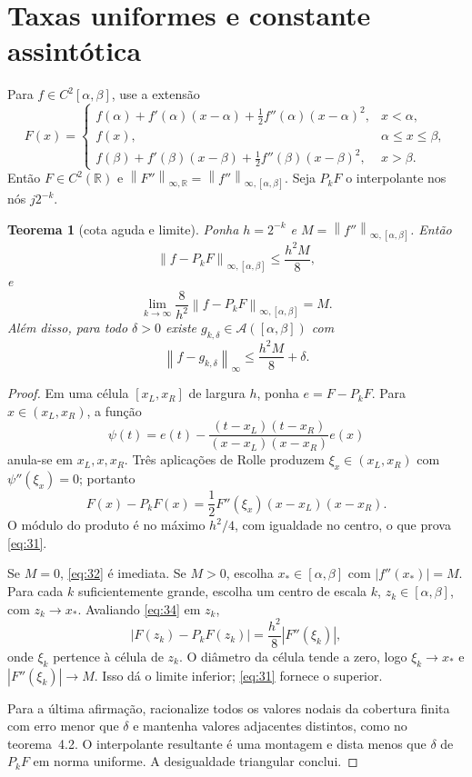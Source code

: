 \documentclass[11pt,a4paper]{article}
\theoremstyle{preciso}
\newtheorem{teorema}{Teorema}[section]
\theoremstyle{definition}
\newcommand{\R}{\mathbb R}
\newcommand{\Asm}{\mathcal A}
\newcommand{\norm}[1]{\left\|#1\right\|_{\infty}}
\newcommand{\normK}[2]{\left\|#1\right\|_{\infty,#2}}
\newcommand{\eqn}[2]{\begin{equation}\label{eq:#1}#2\end{equation}}
\begin{document}


\section{Taxas uniformes e constante assintótica}
Para $f\in C^2[\alpha,\beta]$, use a extensão
\eqn{30}{F(x)=\begin{cases}
f(\alpha)+f'(\alpha)(x-\alpha)+\frac12f''(\alpha)(x-\alpha)^2,&x<\alpha,\\
f(x),&\alpha\le x\le\beta,\\
f(\beta)+f'(\beta)(x-\beta)+\frac12f''(\beta)(x-\beta)^2,&x>\beta.
\end{cases}}
Então $F\in C^2(\R)$ e $\normK{F''}{\R}=\normK{f''}{[\alpha,\beta]}$. Seja $P_kF$ o interpolante nos nós $j2^{-k}$.

\begin{teorema}[cota aguda e limite]
Ponha $h=2^{-k}$ e $M=\normK{f''}{[\alpha,\beta]}$. Então
\eqn{31}{\normK{f-P_kF}{[\alpha,\beta]}\le\frac{h^2M}8,}
e
\eqn{32}{\lim_{k\to\infty}\frac8{h^2}\normK{f-P_kF}{[\alpha,\beta]}=M.}
Além disso, para todo $\delta>0$ existe $g_{k,\delta}\in\Asm([\alpha,\beta])$ com
\eqn{33}{\norm{f-g_{k,\delta}}\le\frac{h^2M}8+\delta.}
\end{teorema}
\begin{proof}
Em uma célula $[x_L,x_R]$ de largura $h$, ponha $e=F-P_kF$. Para $x\in(x_L,x_R)$, a função
\[
\psi(t)=e(t)-\frac{(t-x_L)(t-x_R)}{(x-x_L)(x-x_R)}e(x)
\]
anula-se em $x_L,x,x_R$. Três aplicações de Rolle produzem $\xi_x\in(x_L,x_R)$ com $\psi''(\xi_x)=0$; portanto
\eqn{34}{F(x)-P_kF(x)=\frac12F''(\xi_x)(x-x_L)(x-x_R).}
O módulo do produto é no máximo $h^2/4$, com igualdade no centro, o que prova \eqref{eq:31}.

Se $M=0$, \eqref{eq:32} é imediata. Se $M>0$, escolha $x_*\in[\alpha,\beta]$ com $|f''(x_*)|=M$. Para cada $k$ suficientemente grande, escolha um centro de escala $k$, $z_k\in[\alpha,\beta]$, com $z_k\to x_*$. Avaliando \eqref{eq:34} em $z_k$,
\[
|F(z_k)-P_kF(z_k)|=\frac{h^2}8|F''(\xi_k)|,
\]
onde $\xi_k$ pertence à célula de $z_k$. O diâmetro da célula tende a zero, logo $\xi_k\to x_*$ e $|F''(\xi_k)|\to M$. Isso dá o limite inferior; \eqref{eq:31} fornece o superior.

Para a última afirmação, racionalize todos os valores nodais da cobertura finita com erro menor que $\delta$ e mantenha valores adjacentes distintos, como no teorema~4.2. O interpolante resultante é uma montagem e dista menos que $\delta$ de $P_kF$ em norma uniforme. A desigualdade triangular conclui.
\end{proof}
\end{document}
